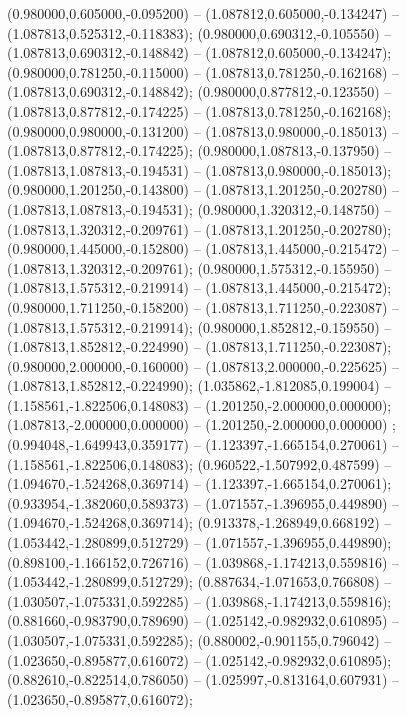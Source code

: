  (0.980000,0.605000,-0.095200) -- (1.087812,0.605000,-0.134247) -- (1.087813,0.525312,-0.118383);
 (0.980000,0.690312,-0.105550) -- (1.087813,0.690312,-0.148842) -- (1.087812,0.605000,-0.134247);
 (0.980000,0.781250,-0.115000) -- (1.087813,0.781250,-0.162168) -- (1.087813,0.690312,-0.148842);
 (0.980000,0.877812,-0.123550) -- (1.087813,0.877812,-0.174225) -- (1.087813,0.781250,-0.162168);
 (0.980000,0.980000,-0.131200) -- (1.087813,0.980000,-0.185013) -- (1.087813,0.877812,-0.174225);
 (0.980000,1.087813,-0.137950) -- (1.087813,1.087813,-0.194531) -- (1.087813,0.980000,-0.185013);
 (0.980000,1.201250,-0.143800) -- (1.087813,1.201250,-0.202780) -- (1.087813,1.087813,-0.194531);
 (0.980000,1.320312,-0.148750) -- (1.087813,1.320312,-0.209761) -- (1.087813,1.201250,-0.202780);
 (0.980000,1.445000,-0.152800) -- (1.087813,1.445000,-0.215472) -- (1.087813,1.320312,-0.209761);
 (0.980000,1.575312,-0.155950) -- (1.087813,1.575312,-0.219914) -- (1.087813,1.445000,-0.215472);
 (0.980000,1.711250,-0.158200) -- (1.087813,1.711250,-0.223087) -- (1.087813,1.575312,-0.219914);
 (0.980000,1.852812,-0.159550) -- (1.087813,1.852812,-0.224990) -- (1.087813,1.711250,-0.223087);
 (0.980000,2.000000,-0.160000) -- (1.087813,2.000000,-0.225625) -- (1.087813,1.852812,-0.224990);
 (1.035862,-1.812085,0.199004) -- (1.158561,-1.822506,0.148083) -- (1.201250,-2.000000,0.000000);
 (1.087813,-2.000000,0.000000) -- (1.201250,-2.000000,0.000000) ;
 (0.994048,-1.649943,0.359177) -- (1.123397,-1.665154,0.270061) -- (1.158561,-1.822506,0.148083);
 (0.960522,-1.507992,0.487599) -- (1.094670,-1.524268,0.369714) -- (1.123397,-1.665154,0.270061);
 (0.933954,-1.382060,0.589373) -- (1.071557,-1.396955,0.449890) -- (1.094670,-1.524268,0.369714);
 (0.913378,-1.268949,0.668192) -- (1.053442,-1.280899,0.512729) -- (1.071557,-1.396955,0.449890);
 (0.898100,-1.166152,0.726716) -- (1.039868,-1.174213,0.559816) -- (1.053442,-1.280899,0.512729);
 (0.887634,-1.071653,0.766808) -- (1.030507,-1.075331,0.592285) -- (1.039868,-1.174213,0.559816);
 (0.881660,-0.983790,0.789690) -- (1.025142,-0.982932,0.610895) -- (1.030507,-1.075331,0.592285);
 (0.880002,-0.901155,0.796042) -- (1.023650,-0.895877,0.616072) -- (1.025142,-0.982932,0.610895);
 (0.882610,-0.822514,0.786050) -- (1.025997,-0.813164,0.607931) -- (1.023650,-0.895877,0.616072);
